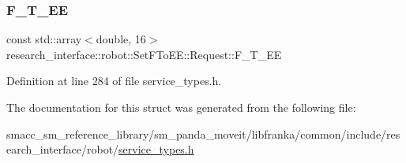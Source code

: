 \subsubsection{\texorpdfstring{F\+\_\+\+T\+\_\+\+EE}{F\_T\_EE}}
{\footnotesize\ttfamily const std\+::array$<$double, 16$>$ research\+\_\+interface\+::robot\+::\+Set\+F\+To\+E\+E\+::\+Request\+::\+F\+\_\+\+T\+\_\+\+EE}



Definition at line 284 of file service\+\_\+types.\+h.



The documentation for this struct was generated from the following file\+:\begin{DoxyCompactItemize}
\item 
smacc\+\_\+sm\+\_\+reference\+\_\+library/sm\+\_\+panda\+\_\+moveit/libfranka/common/include/research\+\_\+interface/robot/\hyperlink{service__types_8h}{service\+\_\+types.\+h}\end{DoxyCompactItemize}
